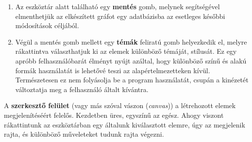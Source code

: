\begin{enumerate}
\item Az eszköztár alatt található egy \textbf{mentés} gomb, melynek segítségével elmenthetjük az elkészített gráfot egy adatbázisba az esetleges későbbi módosítások céljából.

\item Végül a mentés gomb mellett egy \textbf{témák} feliratú gomb helyezkedik el, melyre rákattintva választhatjuk ki az elemek különböző témáját, stílusát. Ez egy apróbb felhasználóbarát élményt nyújt azáltal, hogy különböző színű és alakú formák használatát is lehetővé teszi az alapértelmezetteken kívül. Természetesen ez nem folyásolja be a program használatát, csupán a kinézetét változtatja meg a felhasználó általt kívántra.
\end{enumerate}

A \textbf{szerkesztő felület} (vagy más szóval vászon (\textit{canvas})) a létrehozott elemek megjelenítéséért felelős. Kezdetben üres, egyszínű az egész. Ahogy viszont rákattintunk az eszköztárban egy általunk kiválasztott elemre, úgy az megjelenik rajta, és különböző műveleteket tudunk rajta végezni.

